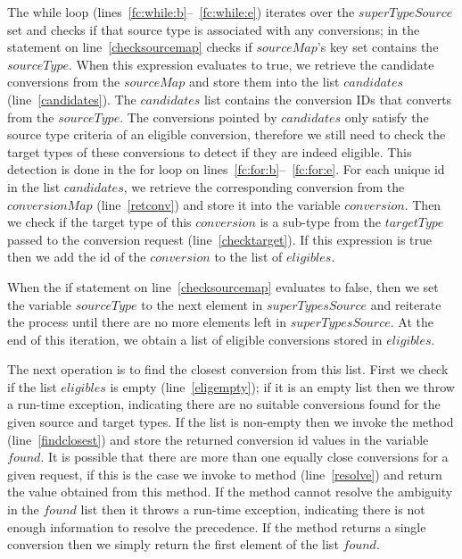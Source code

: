 The while loop (lines~\ref{fc:while:b}--~\ref{fc:while:e}) iterates over the $superTypeSource$ set and checks if that source type is associated with any conversions; in the  statement on line~\ref{checksourcemap} checks if $sourceMap$'s key set contains the $sourceType$.
When this expression evaluates to true, we retrieve the candidate conversions from the $sourceMap$ and store them into the list $candidates$ (line~\ref{candidates}).
The $candidates$ list contains the conversion IDs that converts from the $sourceType$.
The conversions pointed by $candidates$ only satisfy the source type criteria of an eligible conversion, therefore we still need to check the target types of these conversions to detect if they are indeed eligible.
This detection is done in the for loop on lines~\ref{fc:for:b}--~\ref{fc:for:e}.
For each unique id in the list $candidates$, we retrieve the corresponding conversion from the $conversionMap$ (line~\ref{retconv}) and store it into the variable $conversion$. 
Then we check if the target type of this $conversion$ is a sub-type from the $targetType$ passed to the conversion request (line~\ref{checktarget}). 
If this expression is true then we add the id of the $conversion$ to the list of $eligibles$.

When the if statement on line~\ref{checksourcemap} evaluates to false, then we set the variable $sourceType$ to the next element in $superTypesSource$ and reiterate the process until there are no more elements left in $superTypesSource$.
At the end of this iteration, we obtain a list of eligible conversions stored in $eligibles$.

The next operation is to find the closest conversion from this list. 
First we check if the list $eligibles$ is empty (line~\ref{eligempty}); if it is an empty list then we throw a run-time exception, indicating there are no suitable conversions found for the given source and target types.
If the list is non-empty then we invoke the method  (line~\ref{findclosest}) and store the returned conversion id values in the variable $found$. 
It is possible that there are more than one equally close conversions for a given request, if this is the case we invoke to  method (line~\ref{resolve}) and return the value obtained from this method. 
If the  method cannot resolve the ambiguity in the $found$ list then it throws a run-time exception, indicating there is not enough information to resolve the precedence.
If the  method returns a single conversion then we simply return the first element of the list $found$.

